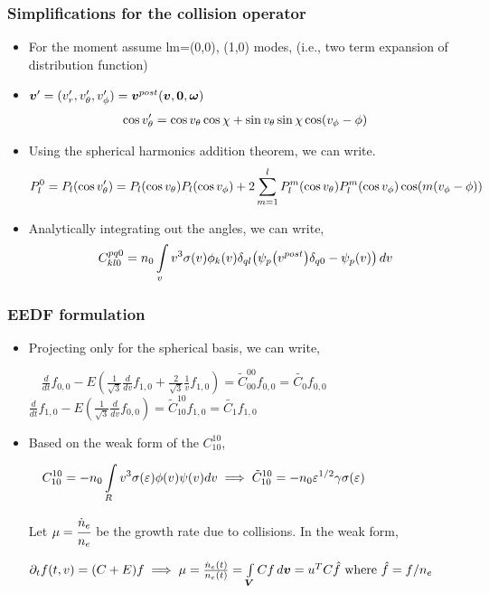 \documentclass[mathserif, aspectratio=169]{beamer}
\newcommand{\vect}[1]{\boldsymbol{#1}}
\newcommand{\of}[1]{\mleft( #1 \mright)}
\newcommand{\myint}{\int\limits}
\newcommand{\vr}{v}
\newcommand{\diff}[1]{\, d#1}
\begin{document}
\begin{frame}
	\frametitle{Simplifications for the collision operator}
	\begin{itemize}
		\item For the moment assume lm=(0,0), (1,0) modes, (i.e., two term expansion of distribution function)
		\item $\vect{v}^{\prime} = (v_r^\prime, v_\theta^\prime, v_\phi^\prime) =\vect{v}^{post}\of{\vect{v},\vect{0},\vect{\omega}}$
		\begin{align*}
			\cos v_\theta^\prime = \cos v_\theta \cos\chi + \sin v_\theta \sin \chi \cos\of{v_\phi-\phi}
		\end{align*}
		\item Using the spherical harmonics addition theorem, we can write. 
		\begin{align*}
			P_l^{0} = P_l\of{\cos v_\theta^\prime} =  P_l\of{\cos v_\theta} P_l\of{\cos v_\phi} + 2\sum_{m=1}^{l} P_l^{m}\of{\cos v_\theta} P_l^{m}\of{\cos v_\phi} \cos \of{ m (v_\phi-\phi)}
		\end{align*}
		\item Analytically integrating out the angles, we can write,
		\begin{align*}
			C^{pq0}_{kl0}  = n_0 \myint_{v} v^3 \sigma\of{v} \phi_k\of{v} \delta_{ql} \of{\psi_p\of{v^{post}}\delta_{q0} - \psi_p\of{v}} \diff{v}  
		\end{align*}
	\end{itemize}
\end{frame}

\begin{frame}
	\frametitle{EEDF formulation}
	\begin{itemize}
		\item Projecting only for the spherical basis, we can write, 
		\begin{center}
		$
		\displaystyle
		\quad
		\frac{d}{dt} f_{0,0} - E 
		\left( \frac{1}{\sqrt{3}} \frac{d}{d\vr} f_{1,0} 
		+  \frac{2}{\sqrt{3}} \frac{1}{\vr} f_{1,0} \right) = \tilde{C}^{00}_{00} f_{0,0} = \tilde{C_0} f_{0,0}
		$
		$\frac{d}{dt} f_{1,0} - E 
		\left( \frac{1}{\sqrt{3}} \frac{d}{d\vr} f_{0,0} \right) =  \tilde{C}^{10}_{10} f_{1,0} = \tilde{C_1} f_{1,0}
		$
		\end{center}
		\item Based on the weak form of the $C^{10}_{10}$, 
		\begin{center}
			$
			\displaystyle
			\quad
			C^{10}_{10} = -n_0 \myint_{R} v^3 \sigma\of{\varepsilon} \phi(v) \psi(v) dv \implies  \tilde{C}^{10}_{10} = -n_0 \varepsilon^{1/2} \gamma \sigma\of{\varepsilon} $
		\end{center} Let $\mu = \cfrac{\dot{n}_e}{n_e}$ be the growth rate due to collisions. In the weak form, 
		\begin{center}
			$\partial_t f(t,v) = (C + E)f \implies \mu = \frac{\dot{n}_e\of{t}}{n_e\of{t}} = \myint_{\vect{V}} C f \diff{\vect{v}} = u^T C \hat{f} \text{ where } \hat{f} = f/n_e$
		\end{center}
	\end{itemize}
\end{frame}
\end{document}
